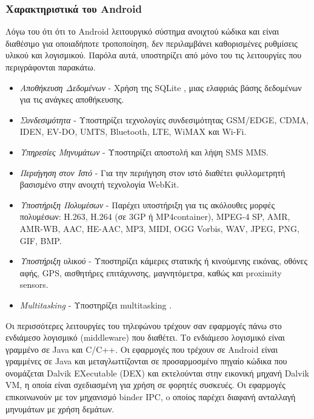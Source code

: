 \documentclass[12pt,twoside,openright]{report}
\begin{document}
\subsubsection{Χαρακτηριστικά του \lt Android\gt}
Λόγω του ότι ότι το \lt Android  λειτουργικό σύστημα ανοιχτού κώδικα και είναι διαθέσιμο για οποιαδήποτε τροποποίηση, δεν περιλαμβάνει καθορισμένες ρυθμίσεις υλικού και λογισμικού. Παρόλα αυτά, υποστηρίζει από μόνο του τις  λειτουργίες που περιγράφονται παρακάτω\cite{Lee:2011}.
\begin{itemize}
\item\emph{Αποθήκευση Δεδομένων} - Χρήση της \lt SQLite \gt, μιας ελαφριάς βάσης δεδομένων για τις ανάγκες αποθήκευσης.
\item\emph{Συνδεσιμότητα} - Υποστηρίζει τεχνολογίες συνδεσιμότητας \lt GSM/EDGE, CDMA, IDEN, EV-DO, UMTS, Bluetooth, LTE, WiMAX \gt και \lt Wi-Fi.\gt
\item\emph{Υπηρεσίες Μηνυμάτων} - Υποστηρίζει αποστολή και λήψη \lt SMS  \lt MMS.\gt
\item\emph{Περιήγηση στον Ιστό} - Για την περιήγηση στον ιστό διαθέτει φυλλομετρητή βασισμένο στην ανοιχτή τεχνολογία \lt WebKit.\gt
\item\emph{Υποστήριξη Πολυμέσων} - Παρέχει υποστήριξη για τις ακόλουθες μορφές πολυμέσων: \lt H.263, H.264 (\gt σε \lt 3GP \gt ή \lt MP4container), MPEG-4 SP, AMR, AMR-WB, AAC, HE-AAC, MP3, MIDI, OGG Vorbis, WAV, JPEG, PNG, GIF, BMP. \gt 
\item\emph{Υποστήριξη υλικού} - Υποστηρίζει κάμερες στατικής ή κινούμενης εικόνας, οθόνες αφής, \lt GPS, \gt αισθητήρες επιτάχυνσης, μαγνητόμετρα, καθώς και proximity sensors.                                                            
\item\emph{\lt Multitasking\gt} - Υποστηρίζει \lt multitasking .
\end{itemize}

Οι περισσότερες λειτουργίες του τηλεφώνου τρέχουν σαν εφαρμογές πάνω στο ενδιάμεσο λογισμικό \lt (middleware) \gt που διαθέτει. Το ενδιάμεσο λογισμικό είναι γραμμένο σε \lt Java \gt και \lt C/C++. \gt Οι εφαρμογές που τρέχουν σε \lt Android \gt είναι γραμμένες σε \lt Java \gt και μεταγλωττίζονται σε προσαρμοσμένο πηγαίο κώδικα που ονομάζεται  \lt Dalvik EXecutable (DEX) \gt και εκτελούνται στην εικονική μηχανή \lt Dalvik VM, \gt η οποία είναι σχεδιασμένη για χρήση σε φορητές συσκευές. Οι εφαρμογές επικοινωνούν με τον μηχανισμό \lt binder IPC, \gt o  οποίος παρέχει διαφανή ανταλλαγή μηνυμάτων με χρήση δεμάτων.\cite{taintdroid}
\end{document}
